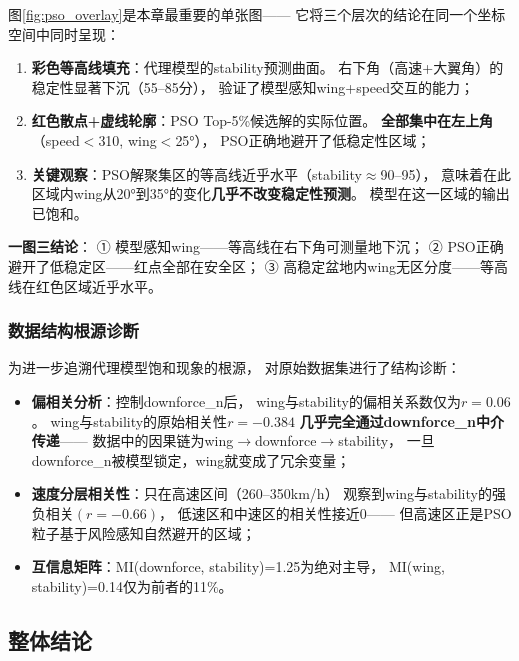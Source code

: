 图\ref{fig:pso_overlay}是本章最重要的单张图——
它将三个层次的结论在同一个坐标空间中同时呈现：

\begin{enumerate}
    \item \textbf{彩色等高线填充}：代理模型的stability预测曲面。
        右下角（高速+大翼角）的稳定性显著下沉（55--85分），
        验证了模型感知wing+speed交互的能力；
    \item \textbf{红色散点+虚线轮廓}：PSO Top-5\%候选解的实际位置。
        \textbf{全部集中在左上角}（speed$<$310, wing$<$25°），
        PSO正确地避开了低稳定性区域；
    \item \textbf{关键观察}：PSO解聚集区的等高线近乎水平（stability$\approx$90--95），
        意味着在此区域内wing从20°到35°的变化\textbf{几乎不改变稳定性预测}。
        模型在这一区域的输出已饱和。
\end{enumerate}

\textbf{一图三结论}：
① 模型感知wing——等高线在右下角可测量地下沉；
② PSO正确避开了低稳定区——红点全部在安全区；
③ 高稳定盆地内wing无区分度——等高线在红色区域近乎水平。

\subsubsection{数据结构根源诊断}

为进一步追溯代理模型饱和现象的根源，
对原始数据集进行了结构诊断：

\begin{itemize}
    \item \textbf{偏相关分析}：控制downforce\_n后，
        wing与stability的偏相关系数仅为$r=0.06$。
        wing与stability的原始相关性$r=-0.384$
        \textbf{几乎完全通过downforce\_n中介传递}——
        数据中的因果链为wing$\to$downforce$\to$stability，
        一旦downforce\_n被模型锁定，wing就变成了冗余变量；
    \item \textbf{速度分层相关性}：只在高速区间（260--350km/h）
        观察到wing与stability的强负相关$(r=-0.66)$，
        低速区和中速区的相关性接近0——
        但高速区正是PSO粒子基于风险感知自然避开的区域；
    \item \textbf{互信息矩阵}：MI(downforce, stability)=1.25为绝对主导，
        MI(wing, stability)=0.14仅为前者的11\%。
\end{itemize}

\subsection{整体结论}

